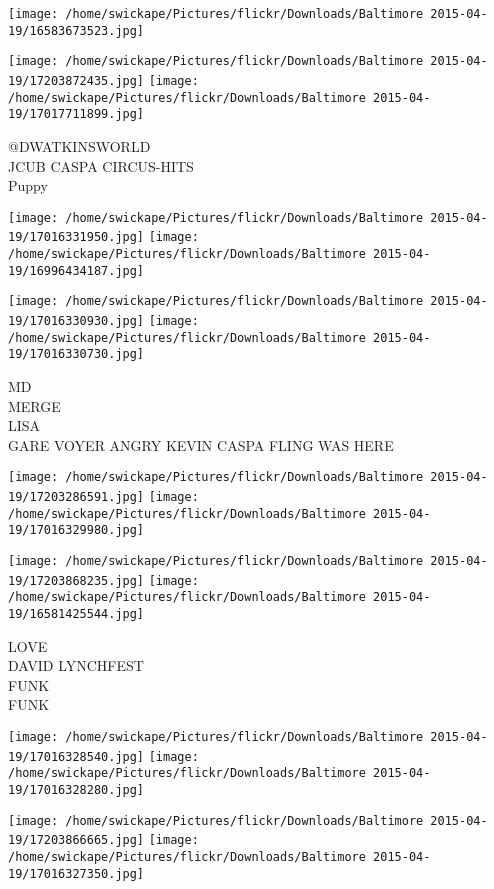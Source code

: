 \documentclass[10pt,letterpaper]{article}
\begin{document}
\texttt{[image: /home/swickape/Pictures/flickr/Downloads/Baltimore 2015-04-19/16583673523.jpg]}

\vspace{0.25in}
\texttt{[image: /home/swickape/Pictures/flickr/Downloads/Baltimore 2015-04-19/17203872435.jpg]}
\texttt{[image: /home/swickape/Pictures/flickr/Downloads/Baltimore 2015-04-19/17017711899.jpg]}

@DWATKINSWORLD\\
JCUB CASPA CIRCUS{-}HITS\\
Puppy\\
\pagebreak

\texttt{[image: /home/swickape/Pictures/flickr/Downloads/Baltimore 2015-04-19/17016331950.jpg]}
\texttt{[image: /home/swickape/Pictures/flickr/Downloads/Baltimore 2015-04-19/16996434187.jpg]}

\texttt{[image: /home/swickape/Pictures/flickr/Downloads/Baltimore 2015-04-19/17016330930.jpg]}
\texttt{[image: /home/swickape/Pictures/flickr/Downloads/Baltimore 2015-04-19/17016330730.jpg]}

MD\\
MERGE\\
LISA\\
GARE VOYER ANGRY KEVIN CASPA FLING WAS HERE\\
\pagebreak

\texttt{[image: /home/swickape/Pictures/flickr/Downloads/Baltimore 2015-04-19/17203286591.jpg]}
\texttt{[image: /home/swickape/Pictures/flickr/Downloads/Baltimore 2015-04-19/17016329980.jpg]}

\texttt{[image: /home/swickape/Pictures/flickr/Downloads/Baltimore 2015-04-19/17203868235.jpg]}
\texttt{[image: /home/swickape/Pictures/flickr/Downloads/Baltimore 2015-04-19/16581425544.jpg]}

LOVE\\
DAVID LYNCHFEST\\
FUNK\\
FUNK\\
\pagebreak

\texttt{[image: /home/swickape/Pictures/flickr/Downloads/Baltimore 2015-04-19/17016328540.jpg]}
\texttt{[image: /home/swickape/Pictures/flickr/Downloads/Baltimore 2015-04-19/17016328280.jpg]}

\texttt{[image: /home/swickape/Pictures/flickr/Downloads/Baltimore 2015-04-19/17203866665.jpg]}
\texttt{[image: /home/swickape/Pictures/flickr/Downloads/Baltimore 2015-04-19/17016327350.jpg]}
\end{document}
